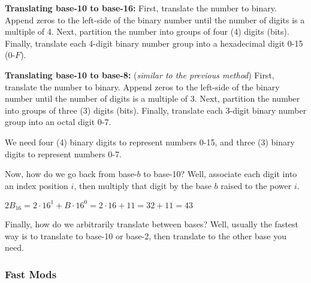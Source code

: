\documentclass[main.tex]{subfiles}
\begin{document}
\begin{boxx}
	\textbf{Translating base-10 to base-16:} First, translate the number to binary. Append zeros to the left-side of the binary number until the number of digits is a multiple of 4. Next, partition the number into groups of four (4) digits (bits). Finally, translate each 4-digit binary number group into a hexadecimal digit 0-15 (0-\(F\)).
\end{boxx}


\begin{boxx}
	\textbf{Translating base-10 to base-8:} (\textit{similar to the previous method}) First, translate the number to binary. Append zeros to the left-side of the binary number until the number of digits is a multiple of 3. Next, partition the number into groups of three (3) digits (bits). Finally, translate each 3-digit binary number group into an octal digit 0-7.
\end{boxx}


\begin{rem}
	We need four (4) binary digits to represent numbers 0-15, and three (3) binary digits to represent numbers 0-7.
\end{rem}

Now, how do we go back from base-\(b\) to base-10? Well, associate each digit into an index position \(i\), then multiply that digit by the base \(b\) raised to the power \(i\).

\begin{example}
	\(2B_{16} = 2 \cdot 16^1 + B \cdot 16^0 = 2 \cdot 16 + 11 = 32 + 11 = 43\)
\end{example}

Finally, how do we arbitrarily translate between bases? Well, usually the fastest way is to translate to base-10 or base-2, then translate to the other base you need.

\subsubsection{Fast Mods}
\end{document}

